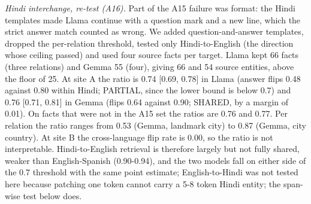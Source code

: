 \documentclass[11pt]{article}
\begin{document}
\emph{Hindi interchange, re-test (A16).} Part of the A15 failure was format: the Hindi templates made Llama continue with a question mark and a new line, which the strict answer match counted as wrong. We added question-and-answer templates, dropped the per-relation threshold, tested only Hindi-to-English (the direction whose ceiling passed) and used four source facts per target. Llama kept 66 facts (three relations) and Gemma 55 (four), giving 66 and 54 source entities, above the floor of 25. At site A the ratio is 0.74 {[}0.69, 0.78{]} in Llama (answer flips 0.48 against 0.80 within Hindi; PARTIAL, since the lower bound is below 0.7) and 0.76 {[}0.71, 0.81{]} in Gemma (flips 0.64 against 0.90; SHARED, by a margin of 0.01). On facts that were not in the A15 set the ratios are 0.76 and 0.77. Per relation the ratio ranges from 0.53 (Gemma, landmark city) to 0.87 (Gemma, city country). At site B the cross-language flip rate is 0.00, so the ratio is not interpretable. Hindi-to-English retrieval is therefore largely but not fully shared, weaker than English-Spanish (0.90-0.94), and the two models fall on either side of the 0.7 threshold with the same point estimate; English-to-Hindi was not tested here because patching one token cannot carry a 5-8 token Hindi entity; the span-wise test below does.
\end{document}
